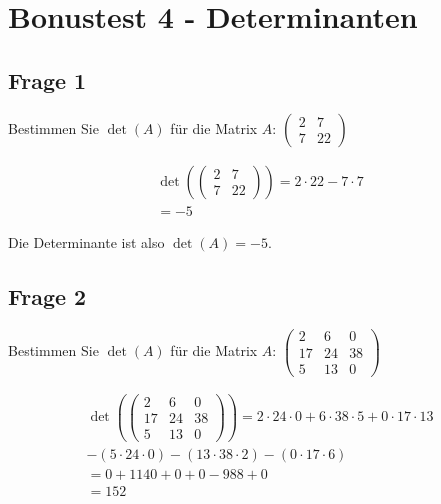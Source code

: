 \chapter{Bonustest 4 - Determinanten}

\section{Frage 1}

Bestimmen Sie $\det(A)$ für die Matrix $A$: $\begin{pmatrix}
        2 & 7  \\
        7 & 22
    \end{pmatrix}$

\begin{align*}
    \det\left(\begin{pmatrix}
                  2 & 7  \\
                  7 & 22
              \end{pmatrix}\right) = 2 \cdot 22 - 7 \cdot 7 \\
    = -5
\end{align*}

Die Determinante ist also $\det(A) = -5$.

\section{Frage 2}

Bestimmen Sie $\det(A)$ für die Matrix $A$: $\begin{pmatrix}
        2  & 6  & 0  \\
        17 & 24 & 38 \\
        5  & 13 & 0
    \end{pmatrix}$

\begin{align*}
    \det\left(\begin{pmatrix}
                  2  & 6  & 0  \\
                  17 & 24 & 38 \\
                  5  & 13 & 0
              \end{pmatrix}\right) = 2 \cdot 24 \cdot 0 + 6 \cdot 38 \cdot 5 + 0 \cdot 17 \cdot 13 \\
    - (5 \cdot 24 \cdot 0) - (13 \cdot 38 \cdot 2) - (0 \cdot 17 \cdot 6)                          \\
    = 0 + 1140 + 0 + 0 - 988 + 0                                                                   \\
    = 152
\end{align*}

